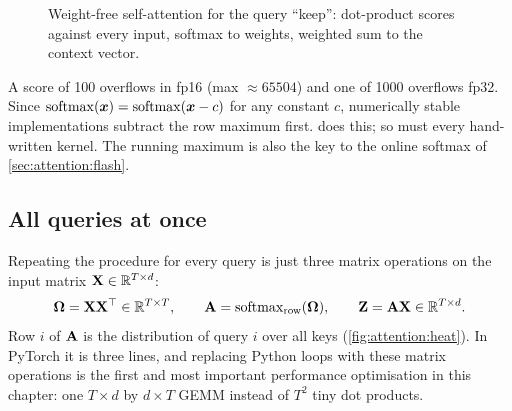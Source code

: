 \begin{figure}[t]
\centering
{}
\caption{Weight-free self-attention for the query ``keep'': dot-product scores against every
input, softmax to weights, weighted sum to the context vector.}
\label{fig:attention:onequery}
\end{figure}

\begin{pitfall}
A score of 100 overflows  in fp16 (max $\approx 65504$) and one of 1000 overflows fp32.
Since $\operatorname{softmax}(\bm{x}) = \operatorname{softmax}(\bm{x}-c)$ for any constant $c$, numerically stable
implementations subtract the row maximum first.  does this; so must every
hand-written kernel. The running maximum is also the key to the online softmax of
\cref{sec:attention:flash}.
\end{pitfall}

\subsection{All queries at once}
Repeating the procedure for every query is just three matrix operations on the input matrix
$\mathbf{X}\in\mathbb{R}^{T\times d}$:
\begin{equation}
\mathbf{\Omega} = \mathbf{X}\mathbf{X}^\top \in\mathbb{R}^{T\times T},\qquad
\mathbf{A} = \operatorname{softmax}_{\text{row}}(\mathbf{\Omega}),\qquad
\mathbf{Z} = \mathbf{A}\mathbf{X}\in\mathbb{R}^{T\times d}.
\label{eq:attention:simple}
\end{equation}
Row $i$ of $\mathbf{A}$ is the distribution of query $i$ over all keys (\cref{fig:attention:heat}).
In PyTorch it is three lines, and replacing Python loops with these matrix operations is the
first and most important performance optimisation in this chapter: one $T\times d$ by $d\times T$
GEMM instead of $T^2$ tiny dot products.

